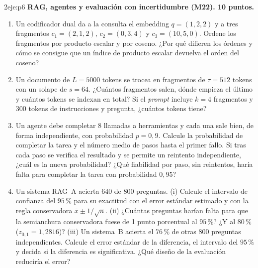 \begin{ejercicio}{2}{eje:p6}
\textbf{RAG, agentes y evaluación con incertidumbre (M22). 10 puntos.}
\begin{enumerate}[label=(\alph*)]
  \item {} Un codificador dual da a la consulta el embedding $q=(1,2,2)$ y a tres fragmentos $c_1=(2,1,2)$, $c_2=(0,3,4)$ y $c_3=(10,5,0)$. Ordene los fragmentos por producto escalar y por coseno. ¿Por qué difieren los órdenes y cómo se consigue que un índice de producto escalar devuelva el orden del coseno?
  \item {} Un documento de $L=5000$ tokens se trocea en fragmentos de $\tau=512$ tokens con un solape de $s=64$. ¿Cuántos fragmentos salen, dónde empieza el último y cuántos tokens se indexan en total? Si el \emph{prompt} incluye $k=4$ fragmentos y 300 tokens de instrucciones y pregunta, ¿cuántos tokens tiene?
  \item {} Un agente debe completar 8 llamadas a herramientas y cada una sale bien, de forma independiente, con probabilidad $p=0{,}9$. Calcule la probabilidad de completar la tarea y el número medio de pasos hasta el primer fallo. Si tras cada paso se verifica el resultado y se permite un reintento independiente, ¿cuál es la nueva probabilidad? ¿Qué fiabilidad por paso, sin reintentos, haría falta para completar la tarea con probabilidad $0{,}95$?
  \item {} Un sistema RAG~A acierta 640 de 800 preguntas. (i) Calcule el intervalo de confianza del $95\,\%$ para su exactitud con el error estándar estimado y con la regla conservadora $\bar x\pm 1/\sqrt n$. (ii) ¿Cuántas preguntas harían falta para que la semianchura conservadora fuese de 1 punto porcentual al $95\,\%$? ¿Y al $80\,\%$ ($z_{0{,}1}=1{,}2816$)? (iii) Un sistema~B acierta el $76\,\%$ de otras 800 preguntas independientes. Calcule el error estándar de la diferencia, el intervalo del $95\,\%$ y decida si la diferencia es significativa. ¿Qué diseño de la evaluación reduciría el error?
\end{enumerate}
\end{ejercicio}

